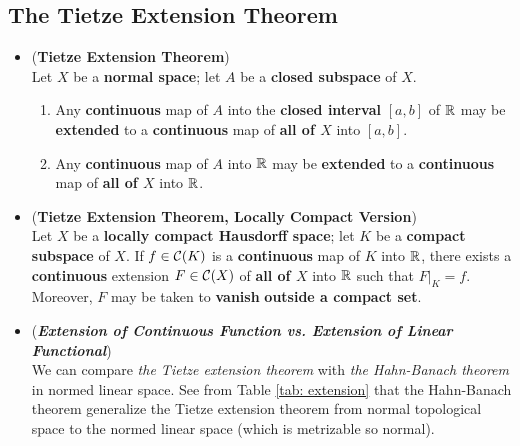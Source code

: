 \documentclass[11pt]{article}
\begin{document}
\subsection{The Tietze Extension Theorem}
\begin{itemize}
\item \begin{theorem} (\textbf{Tietze Extension Theorem}) \citep{munkres2000topology, reed1980methods}\\
Let $X$ be a \textbf{normal space}; let $A$ be a \textbf{closed subspace} of $X$.
\begin{enumerate}
\item Any \textbf{continuous} map of $A$ into the \textbf{closed interval} $[a, b]$ of ${\mathbb R}$ may be \textbf{extended}
to a \textbf{continuous} map of \textbf{all of $X$} into $[a, b]$.
\item Any \textbf{continuous} map of $A$ into ${\mathbb R}$ may be \textbf{extended} to a \textbf{continuous} map of \textbf{all of $X$} into ${\mathbb R}$.
\end{enumerate}
\end{theorem}

\item \begin{theorem} (\textbf{Tietze Extension Theorem, Locally Compact Version}) \citep{folland2013real}\\
Let $X$ be a \textbf{locally compact Hausdorff space}; let $K$ be a \textbf{compact subspace} of $X$. If $f \in {\mathcal C}(K)$ is a \textbf{continuous} map of $K$ into ${\mathbb R}$,   there exists a \textbf{continuous} extension $F \in {\mathcal C}(X)$ of \textbf{all of $X$} into ${\mathbb R}$ such that $F|_{K} = f$. Moreover, $F$ may be taken to \textbf{vanish}\textbf{ outside a compact set}.
\end{theorem} 

\item \begin{remark} (\emph{\textbf{Extension of Continuous Function vs. Extension of Linear Functional}})\\
We can compare \emph{the Tietze extension theorem} with \emph{the Hahn-Banach theorem} in normed linear space. See from Table \ref{tab: extension} that the Hahn-Banach theorem generalize the Tietze extension theorem from normal topological space to the normed linear space (which is metrizable so normal).
\end{remark}
\end{itemize}
\end{document}
